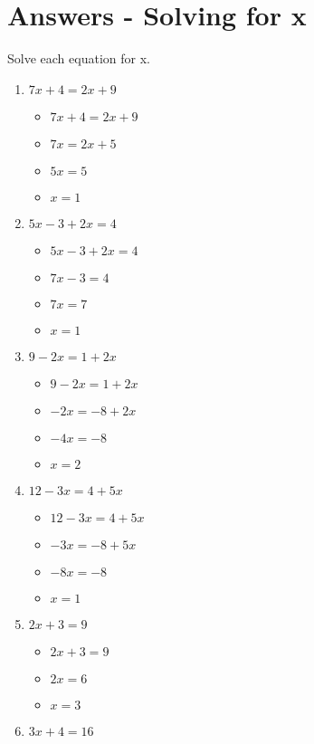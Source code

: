 \documentclass{article}
\begin{document}
\newpage
\section{Answers - Solving for x}
Solve each equation for x.
\begin{enumerate}
\item $7x+4=2x+9$
  \begin{itemize}
  \item $7x+4=2x+9$
  \item $7x=2x+5$
  \item $5x=5$
  \item $x=1$
  \end{itemize}
\item $5x-3+2x=4$
  \begin{itemize}
  \item $5x-3+2x=4$
  \item $7x-3=4$
  \item $7x=7$
  \item $x=1$
  \end{itemize}
\item $9-2x=1+2x$
  \begin{itemize}
  \item $9-2x=1+2x$
  \item $-2x=-8+2x$
  \item $-4x=-8$
  \item $x=2$
  \end{itemize}
\item $12-3x=4+5x$
  \begin{itemize}
  \item $12-3x=4+5x$
  \item $-3x=-8+5x$
  \item $-8x=-8$
  \item $x=1$
  \end{itemize}
\item $2x+3=9$
  \begin{itemize}
  \item $2x+3=9$
  \item $2x=6$
  \item $x=3$
  \end{itemize}
\item $3x+4=16$
  \begin{itemize}

\end{itemize}
\end{enumerate}
\end{document}
